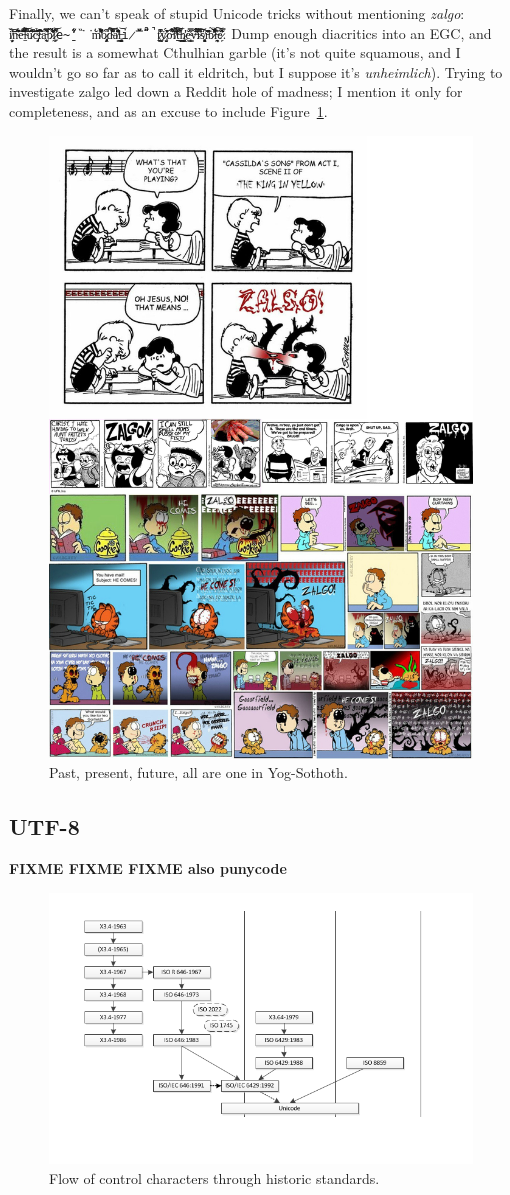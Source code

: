 \documentclass[letterpaper,10pt]{article}
\begin{document}
Finally, we can't speak of stupid Unicode tricks without mentioning
\textit{zalgo}: \texttt{i̸̬̦͙̒̌̓͝n̴͛̓͋̈́͂̇̑̅̕e̵̎̈́̎̀̐̓͆͘͝l̴̠͛͂̃́̅̄̚͝u̷̾́̄̇́̎͂̚͝c̴̡̟̜̉̈́̋͂̈́̎t̵́͊̂̑̑̇̒̃̄å̵̰͎̫̅̿̏͂̽b̷̛͋̎́͛́͋̈͌l̷̰͎̫͐̑̈͛͆͝e̴̱̋̾̃̒̏͘͘̕m̸̆͋͌̍̉͆͌͛̓ȍ̷̡̜̭͙̞̣̎̚d̴̐̃͆̈́̽̔̐̀͝ä̸́̑̐̒͊̔̾́̕l̶̨̡̙̳̭̮̠̼͝i̷̋̆̌̿̎̃̋̚̚ṯ̷̱̫̺͗͒̔͆̄ẏ̷̡̛̮͈͑̓́͊ȏ̵͋̅́̋͒̐̇͝f̸̛̃͐͒̈̾̆̕͠t̶͈̱̠͋̑̊̿̇͘h̷̰͚̳̳̤͗̓͗̄e̴͇͙̜̿͐́̎̌͘ṽ̶̌̈́́́̈́͌͂͘i̷̛͊̒̏̄̀̅͠͝s̸̯̘͍̝͓̈́ͅͅì̵̃͊̇͗̄̋̇͘b̷̃̎̓͛̊̾͘̚̚l̶̯̼͎͉̎͛̆͠e̷̙͊̇̿͗̃͊̓́}. Dump enough
diacritics into an EGC, and the result is a somewhat Cthulhian garble (it's not
quite squamous, and I wouldn't go so far as to call it eldritch, but I suppose
it's \textit{unheimlich}). Trying to investigate zalgo led down a Reddit hole
of madness; I mention it only for completeness, and as an excuse to include
Figure~\ref{fig:zalgo}.

\begin{figure}[H]
    \centering
    \includegraphics[width=.5\linewidth]{media/zalgo.png}
    \caption{Past, present, future, all are one in Yog-Sothoth.}
    \label{fig:zalgo}
\end{figure}

\subsection{UTF-8}
\textbf{FIXME FIXME FIXME also punycode}

\begin{figure}[!htb]
    \centering
    \includegraphics[width=.75\linewidth]{media/control-char-standards.png}
    \caption{Flow of control characters through historic standards.}
\end{figure}
\end{document}
